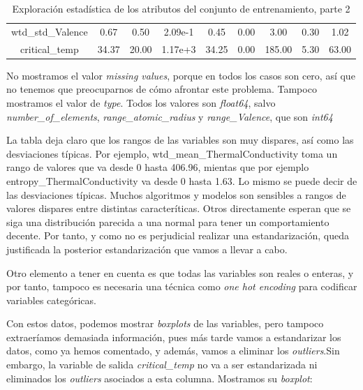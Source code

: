 \documentclass[11pt]{article}
\begin{document}
\begin{table}[H]
{\begin{tabular}{|c|c|c|c|c|c|c|c|c|}
wtd\_std\_Valence                     &    0.67&     0.50&  2.09e-1&     0.45&    0.00&      3.00&     0.30&     1.02 \\
critical\_temp                        &  34.37&    20.00&  1.17e+3&    34.25&    0.00&    185.00&     5.30&    63.00 \\
    \hline
    \end{tabular}
    }
    \caption{Exploración estadística de los atributos del conjunto de entrenamiento, parte 2}
    \label{Tabla con los estadísticos de las features}
\end{table}

No mostramos el valor \emph{missing values}, porque en todos los casos son cero, así que no tenemos que preocuparnos de cómo afrontar este problema. Tampoco mostramos el valor de \emph{type}. Todos los valores son \emph{float64}, salvo \emph{number\_of\_elements}, \emph{range\_atomic\_radius} y \emph{range\_Valence}, que son \emph{int64}

La tabla deja claro que los rangos de las variables son muy dispares, así como las desviaciones típicas. Por ejemplo, wtd\_mean\_ThermalConductivity toma un rango de valores que va desde 0 hasta 406.96, mientas que por ejemplo entropy\_ThermalConductivity va desde 0 hasta 1.63. Lo mismo se puede decir de las desviaciones típicas. Muchos algoritmos y modelos son sensibles a rangos de valores dispares entre distintas caracteríticas. Otros directamente esperan que se siga una distribución parecida a una normal para tener un comportamiento decente. Por tanto, y como no es perjudicial realizar una estandarización, queda justificada la posterior estandarización que vamos a llevar a cabo.

Otro elemento a tener en cuenta es que todas las variables son reales o enteras, y por tanto, tampoco es necesaria una técnica como \emph{one hot encoding} para codificar variables categóricas.

Con estos datos, podemos mostrar \emph{boxplots} de las variables, pero tampoco extraeríamos demasiada información, pues más tarde vamos a estandarizar los datos, como ya hemos comentado, y además, vamos a eliminar los \emph{outliers}.Sin embargo, la variable de salida \emph{critical\_temp} no va a ser estandarizada ni eliminados los \emph{outliers} asociados a esta columna. Mostramos su \emph{boxplot}:
\end{document}
